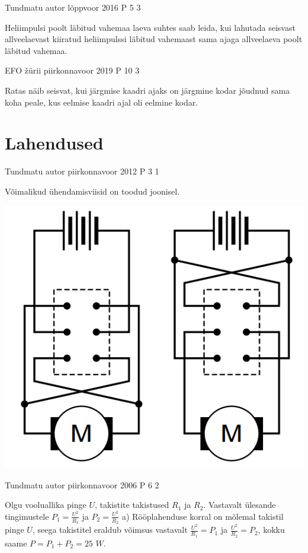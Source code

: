 \documentclass[11pt]{article}
\begin{document}
{%
{Tundmatu autor} %
{lõppvoor} %
{2016} %
{P 5} %
{3} %
{

\ifHint
Heliimpulsi poolt läbitud vahemaa laeva suhtes saab leida, kui lahutada seisvast allveelaevast kiiratud heliimpulssi läbitud vahemaast sama ajaga allveelaeva poolt läbitud vahemaa.
\fi
}


{EFO žürii} %
{piirkonnavoor} %
{2019} %
{P 10} %
{3} %
{

\ifHint
Ratas näib seisvat, kui järgmise kaadri ajaks on järgmine kodar jõudnud sama koha peale, kus eelmise kaadri ajal oli eelmine kodar.
\fi
}
\newpage\section{Lahendused}
        \ToggleSolution
        
{Tundmatu autor} %
{piirkonnavoor} %
{2012} %
{P 3} %
{1} %
{

\ifSolution
Võimalikud ühendamisviisid on toodud joonisel.
\begin{center}
	\includegraphics[width=0.5\linewidth]{2012-v2p-03-lah.png}
\end{center}
\fi
}

{Tundmatu autor} %
{piirkonnavoor} %
{2006} %
{P 6} %
{2} %
{

\ifSolution
Olgu vooluallika pinge $U$, takistite takistused $R_1$ ja $R_2$. Vastavalt ülesande tingimustele
$P_1 = \frac{U^2}{R_1}$ ja $P_2 = \frac{U^2}{R_2}$
a) Rööplahenduse korral on mõlemal takistil pinge $U$, seega takistitel eraldub võimsus vastavalt 
$\frac{U^2}{R_1} = P_1$ ja $\frac{U^2}{R_2} = P_2$,
kokku saame $P = P_1 + P_2 = 25$ $W$.

}}
\end{document}
